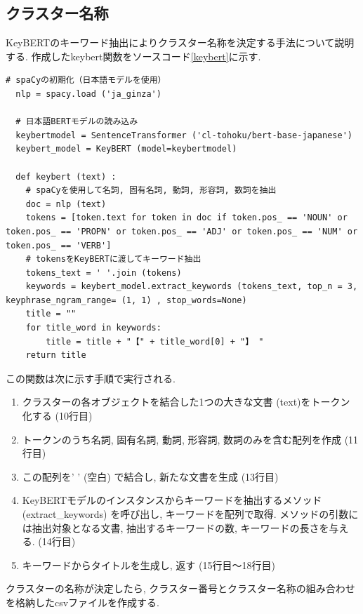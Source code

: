 \subsection{クラスター名称}
KeyBERTのキーワード抽出によりクラスター名称を決定する手法について説明する. 作成したkeybert関数をソースコード\ref{keybert}に示す. 

\begin{lstlisting}[caption=keybert関数, label=keybert]
  # spaCyの初期化（日本語モデルを使用）
  nlp = spacy.load ('ja_ginza') 

  # 日本語BERTモデルの読み込み
  keybertmodel = SentenceTransformer ('cl-tohoku/bert-base-japanese') 
  keybert_model = KeyBERT (model=keybertmodel) 

  def keybert (text) :
    # spaCyを使用して名詞, 固有名詞, 動詞, 形容詞, 数詞を抽出
    doc = nlp (text) 
    tokens = [token.text for token in doc if token.pos_ == 'NOUN' or token.pos_ == 'PROPN' or token.pos_ == 'ADJ' or token.pos_ == 'NUM' or token.pos_ == 'VERB']
    # tokensをKeyBERTに渡してキーワード抽出
    tokens_text = ' '.join (tokens) 
    keywords = keybert_model.extract_keywords (tokens_text, top_n = 3, keyphrase_ngram_range= (1, 1) , stop_words=None) 
    title = ""
    for title_word in keywords:
        title = title + "【" + title_word[0] + "】 "
    return title
\end{lstlisting}

この関数は次に示す手順で実行される. 

\begin{enumerate}
  \item クラスターの各オブジェクトを結合した1つの大きな文書 (text)をトークン化する (10行目)
  \item トークンのうち名詞, 固有名詞, 動詞, 形容詞, 数詞のみを含む配列を作成 (11行目)
  \item この配列を' ' (空白) で結合し, 新たな文書を生成 (13行目)
  \item KeyBERTモデルのインスタンスからキーワードを抽出するメソッド (extract\_keywords) を呼び出し, キーワードを配列で取得. メソッドの引数には抽出対象となる文書, 抽出するキーワードの数, キーワードの長さを与える. (14行目)
  \item キーワードからタイトルを生成し, 返す (15行目〜18行目)
\end{enumerate}

クラスターの名称が決定したら, クラスター番号とクラスター名称の組み合わせを格納したcsvファイルを作成する. 


